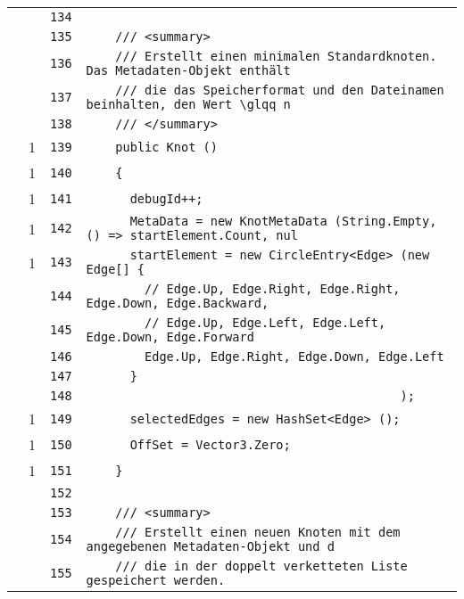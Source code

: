 \documentclass[a4paper,10pt]{article}
\begin{document}
\begin{longtable}[l]{lrrl}
\cellcolor{gray} &  & \verb~134~ & \verb~~\\
\cellcolor{gray} &  & \verb~135~ & \verb~    /// <summary>~\\
\cellcolor{gray} &  & \verb~136~ & \verb~    /// Erstellt einen minimalen Standardknoten. Das Metadaten-Objekt enthält ~\\
\cellcolor{gray} &  & \verb~137~ & \verb~    /// die das Speicherformat und den Dateinamen beinhalten, den Wert \glqq n~\\
\cellcolor{gray} &  & \verb~138~ & \verb~    /// </summary>~\\
\cellcolor{green} & 1 & \verb~139~ & \verb~    public Knot ()~\\
\cellcolor{green} & 1 & \verb~140~ & \verb~    {~\\
\cellcolor{green} & 1 & \verb~141~ & \verb~      debugId++;~\\
\cellcolor{green} & 1 & \verb~142~ & \verb~      MetaData = new KnotMetaData (String.Empty, () => startElement.Count, nul~\\
\cellcolor{green} & 1 & \verb~143~ & \verb~      startElement = new CircleEntry<Edge> (new Edge[] {~\\
\cellcolor{gray} &  & \verb~144~ & \verb~        // Edge.Up, Edge.Right, Edge.Right, Edge.Down, Edge.Backward,~\\
\cellcolor{gray} &  & \verb~145~ & \verb~        // Edge.Up, Edge.Left, Edge.Left, Edge.Down, Edge.Forward~\\
\cellcolor{gray} &  & \verb~146~ & \verb~        Edge.Up, Edge.Right, Edge.Down, Edge.Left~\\
\cellcolor{gray} &  & \verb~147~ & \verb~      }~\\
\cellcolor{gray} &  & \verb~148~ & \verb~                                           );~\\
\cellcolor{green} & 1 & \verb~149~ & \verb~      selectedEdges = new HashSet<Edge> ();~\\
\cellcolor{green} & 1 & \verb~150~ & \verb~      OffSet = Vector3.Zero;~\\
\cellcolor{green} & 1 & \verb~151~ & \verb~    }~\\
\cellcolor{gray} &  & \verb~152~ & \verb~~\\
\cellcolor{gray} &  & \verb~153~ & \verb~    /// <summary>~\\
\cellcolor{gray} &  & \verb~154~ & \verb~    /// Erstellt einen neuen Knoten mit dem angegebenen Metadaten-Objekt und d~\\
\cellcolor{gray} &  & \verb~155~ & \verb~    /// die in der doppelt verketteten Liste gespeichert werden.~\\

\end{longtable}
\end{document}
